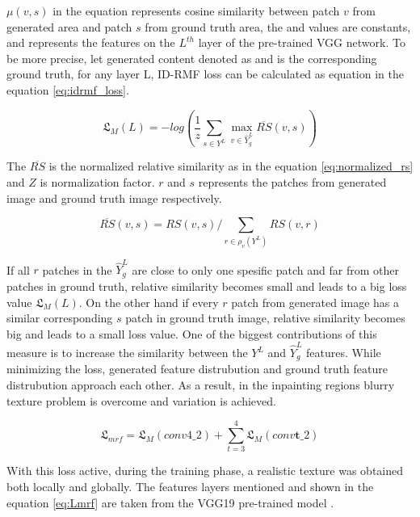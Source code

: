 \(\mu (v, s)\) in the equation represents cosine similarity between patch \(v\) from generated area and patch \(s\) from ground truth area, the  and  values are constants, and  represents the features on the \(L^{th}\) layer of the pre-trained VGG network. To be more precise, let generated content denoted as and is the corresponding ground truth, for any layer L, ID-RMF loss can be calculated as equation in the equation \ref{eq:idrmf_loss}.

\begin{equation}
    \mathfrak{L}_{M}(L) = - log(\frac{1}{z} \sum_{s \in Y^{L}} \max_{v \in \widehat{Y}_{g}^{L}} \overline{RS} (v, s))
    \label{eq:idrmf_loss}
\end{equation}

The \(\overline{RS}\) is the normalized relative similarity as in the equation \ref{eq:normalized_rs} and \(Z\) is normalization factor. \(r\) and \(s\) represents the patches from generated image and ground truth image respectively.

\begin{equation}
    \overline{RS}(v,s) = RS(v,s) / \sum_{r \in \rho_{v}(Y^{L})} RS(v,r)
    \label{eq:normalized_rs}
\end{equation}

If all \(r\) patches in the \(\widehat{Y}_{g}^{L}\) are close to only one spesific patch and far from other patches in ground truth, relative similarity becomes small and leads to a big loss value \(\mathfrak{L}_{M}(L)\). On the other hand if every \(r\) patch from generated image has a similar corresponding \(s\) patch in ground truth image, relative similarity becomes big and leads to a small loss value. One of the biggest contributions of this measure is to increase the similarity between the \(Y^{L}\) and \(\widehat{Y}_{g}^{L}\) features. While minimizing the loss, generated feature distrubution and ground truth feature distrubution approach each other. As a result, in the inpainting regions blurry texture problem is overcome and variation is achieved.

\begin{equation}
    \mathfrak{L}_{mrf} = \mathfrak{L}_{M}(conv4 \_ 2) + \sum_{t = 3}^{4} \mathfrak{L}_{M}(conv \mathbf{t} \_ 2)
    \label{eq:Lmrf}
\end{equation}

With this loss active, during the training phase, a realistic texture was obtained both locally and globally. The features layers mentioned and shown in the equation \ref{eq:Lmrf} are taken from the VGG19 pre-trained model \cite{very_deep_conv}.

